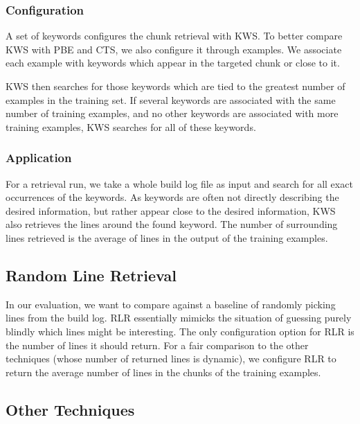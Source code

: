 \subsubsection{Configuration}
A set of keywords configures the chunk retrieval with KWS\@.
To better
compare KWS with PBE and CTS, we also configure it through examples.
We associate each example with keywords which appear in the targeted
chunk or close to it.

KWS then searches for those keywords which are tied to the greatest
number of examples in the training set.
If several keywords are associated with the same number of training
examples, and no other keywords are associated with more training
examples, KWS searches for all of these keywords.

\subsubsection{Application}
For a retrieval run, we take a whole build log file as input and
search for all exact occurrences of the keywords.
As keywords are
often not directly describing the desired information, but rather
appear close to the desired information, KWS also retrieves the lines
around the found keyword.
The number of surrounding lines retrieved is
the average of lines in the output of the training examples.


\subsection{Random Line Retrieval}
\label{sec:expl-rlr}
In our evaluation, we want to compare against a baseline of randomly
picking lines from the build log.
RLR essentially mimicks the
situation of guessing purely blindly which lines might be interesting.
The only configuration option for RLR is the number of lines it should
return.
For a fair comparison to the other techniques (whose number of
returned lines is dynamic), we configure RLR to return the average
number of lines in the chunks of the training examples.


\subsection{Other Techniques}

